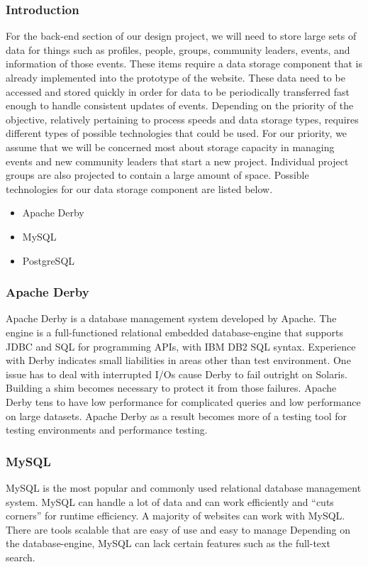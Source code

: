 \documentclass[draftclsnofoot,10pt,onecolumn]{IEEEtran} %
\begin{document}
\subsubsection{Introduction}
For the back-end section of our design project, we will need to store large sets of data for things such as profiles, people,
groups, community leaders, events, and information of those events. These items require a data storage component that is
already implemented into the prototype of the website. These data need to be accessed and stored quickly in order for data to
be periodically transferred fast enough to handle consistent updates of events. Depending on the priority of the objective,
relatively pertaining to process speeds and data storage types, requires different types of possible technologies that could be
used. For our priority, we assume that we will be concerned most about storage capacity in managing events and new
community leaders that start a new project. Individual project groups are also projected to contain a large amount of space.
Possible technologies for our data storage component are listed below. \\

	\begin{itemize}
		\item Apache Derby
		\item MySQL
		\item PostgreSQL \\
	\end{itemize}
	
\subsubsection{Apache Derby}
Apache Derby is a database management system developed by Apache. The engine is a full-functioned relational embedded
database-engine that supports JDBC and SQL for programming APIs, with IBM DB2 SQL syntax. Experience with Derby
indicates small liabilities in areas other than test environment. One issue has to deal with interrupted I/Os cause Derby to fail
outright on Solaris. Building a shim becomes necessary to protect it from those failures. Apache Derby tens to have low
performance for complicated queries and low performance on large datasets. Apache Derby as a result becomes more of a
testing tool for testing environments and performance testing. \\

\subsubsection{MySQL}
MySQL is the most popular and commonly used relational database management system. MySQL can handle a lot of data
and can work efficiently and “cuts corners” for runtime efficiency. A majority of websites can work with MySQL. There are
tools scalable that are easy of use and easy to manage Depending on the database-engine, MySQL can lack certain features
such as the full-text search. \\
\end{document}
